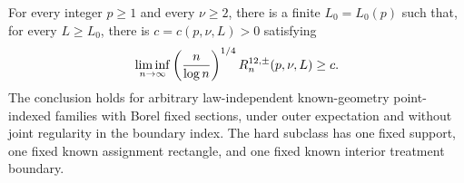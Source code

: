 For every integer \(p\geq1\) and every \(\nu\geq2\), there is a finite \(L_0=L_0(p)\) such that, for every \(L\geq L_0\), there is \(c=c(p,\nu,L)>0\) satisfying
\[
 \liminf_{n\to\infty}\left({n\over\log n}\right)^{1/4}R^{12,\pm}_n(p,\nu,L)\geq c.
\]
The conclusion holds for arbitrary law-independent known-geometry point-indexed families with Borel fixed sections, under outer expectation and without joint regularity in the boundary index.  The hard subclass has one fixed support, one fixed known assignment rectangle, and one fixed known interior treatment boundary.